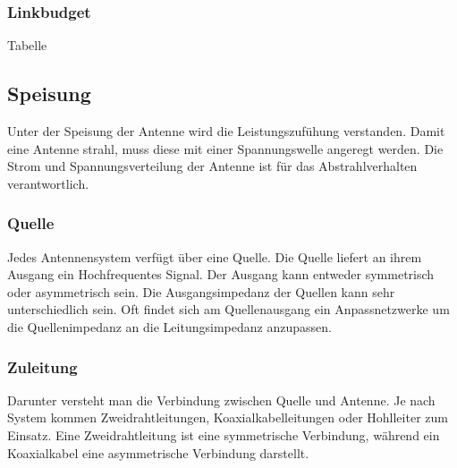 \subsubsection{Linkbudget}
Tabelle
\subsection{Speisung}
Unter der Speisung der Antenne wird die Leistungszufühung verstanden. Damit eine Antenne strahl, muss diese mit einer Spannungswelle angeregt werden. Die Strom und Spannungsverteilung der Antenne ist für das Abstrahlverhalten verantwortlich. 
\subsubsection{Quelle}
Jedes Antennensystem verfügt über eine Quelle.  Die Quelle liefert an ihrem Ausgang ein Hochfrequentes Signal. Der Ausgang kann entweder symmetrisch oder asymmetrisch sein. Die Ausgangsimpedanz der Quellen kann sehr unterschiedlich sein. Oft findet sich am Quellenausgang ein Anpassnetzwerke um die Quellenimpedanz an die Leitungsimpedanz anzupassen.
\subsubsection{Zuleitung}
Darunter versteht man die Verbindung zwischen Quelle und Antenne. Je nach System kommen Zweidrahtleitungen, Koaxialkabelleitungen oder Hohlleiter zum Einsatz. Eine Zweidrahtleitung ist eine symmetrische Verbindung, während ein Koaxialkabel eine asymmetrische Verbindung darstellt.
